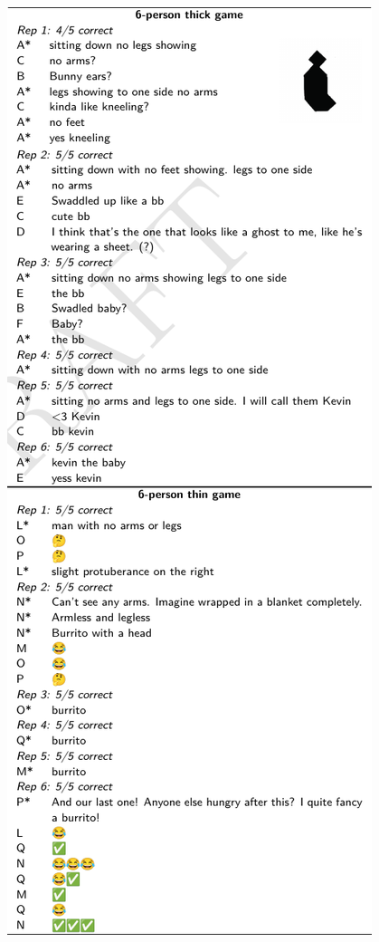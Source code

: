 \documentclass[9pt,twocolumn,twoside]{pnas-new}
\begin{document}
\begin{table}
    \includegraphics{table1.pdf}

\end{table}
\end{document}
